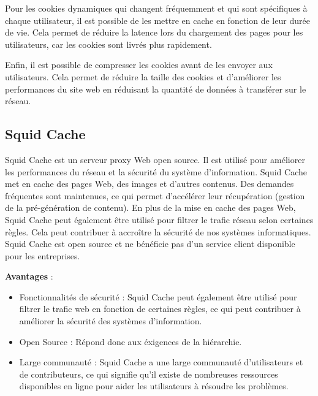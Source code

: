 \documentclass{article}
\begin{document}
Pour les cookies dynamiques qui changent fréquemment et qui sont spécifiques à chaque utilisateur, il est possible de les mettre en cache en fonction de leur durée de vie. Cela permet de réduire la latence lors du chargement des pages pour les utilisateurs, car les cookies sont livrés plus rapidement.

Enfin, il est possible de compresser les cookies avant de les envoyer aux utilisateurs. Cela permet de réduire la taille des cookies et d'améliorer les performances du site web en réduisant la quantité de données à transférer sur le réseau.


\subsection{Squid Cache}

Squid Cache est un serveur proxy Web open source. Il est utilisé pour améliorer les performances du réseau et la sécurité du système d'information. Squid Cache met en cache des pages Web, des images et d'autres contenus.
Des demandes fréquentes sont maintenues, ce qui permet d'accélérer leur récupération (gestion de la pré-génération de contenu). En plus de la mise en cache des pages Web, Squid Cache peut également être utilisé pour filtrer le trafic réseau selon certaines règles. Cela peut contribuer à accroître la sécurité de nos systèmes informatiques.
Squid Cache est open source et ne bénéficie pas d'un service client disponible pour les entreprises.

\hspace{0.1cm}

{\bf Avantages} :\\
\begin{itemize}
    \item Fonctionnalités de sécurité : Squid Cache peut également être utilisé pour filtrer le trafic web en fonction de certaines règles, ce qui peut contribuer à améliorer la sécurité des systèmes d'information.\\
    
    \item Open Source : Répond donc aux éxigences de la hiérarchie.\\
    
    \item Large communauté : Squid Cache a une large communauté d'utilisateurs et de contributeurs, ce qui signifie qu'il existe de nombreuses ressources disponibles en ligne pour aider les utilisateurs à résoudre les problèmes.\\
\end{itemize}
\end{document}
